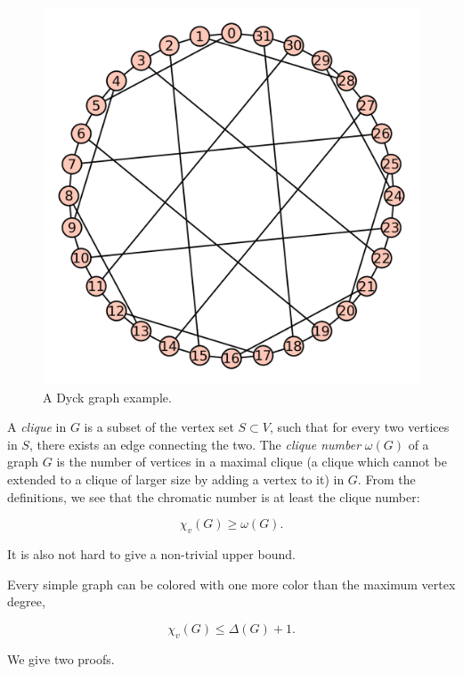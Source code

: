 \begin{figure}[!htbp]
\centering
{}
\includegraphics{image/graph-coloring/dyck-graph-example}
\caption{A Dyck graph example.}
\label{fig:graph_coloring:dyck_graph_example}
\end{figure}

A {\it clique} in $G$ is a subset of the vertex set $S \subset V$, such that
for every two vertices in $S$, there exists an edge connecting the two.
The {\it clique number} $\omega (G)$ of a graph $G$ is the number of vertices
in a maximal clique (a clique which cannot be extended to a clique of
larger size
by adding a vertex to it) in $G$.
From the definitions, we see that
the chromatic number is at least the clique number:

\[
    \chi_v(G) \ge \omega(G).
\]

It is also not hard to give a non-trivial upper bound.

\begin{theorem}
Every simple graph can be colored with one more color than the
maximum vertex degree,

\[
    \chi_v(G) \le \Delta(G) + 1.
\]
\end{theorem}

We give two proofs.

